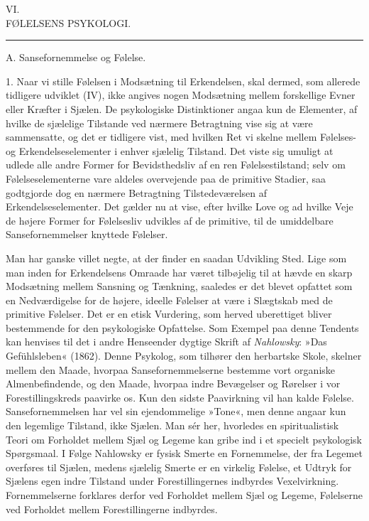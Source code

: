\documentclass[12pt,a4paper,openany]{book}
\newcommand{\opage}[1]{\marginnote{\footnotesize\textit{[#1]}}}
\begin{document}
\clearpage
\opage{268}\begin{center}VI.\\[4pt] FØLELSENS PSYKOLOGI.\\[2pt]\rule{1.5cm}{0.4pt}\end{center}

\begin{center}A. Sansefornemmelse og Følelse.\end{center}

1. Naar vi stille Følelsen i Modsætning til Erkendelsen, skal dermed,
som allerede tidligere udviklet (IV), ikke angives nogen Modsætning
mellem forskellige Evner eller Kræfter i Sjælen. De psykologiske
Distinktioner angaa kun de Elementer, af hvilke de sjælelige Tilstande
ved nærmere Betragtning vise sig at være sammensatte, og det er
tidligere vist, med hvilken Ret vi skelne mellem Følelses- og
Erkendelseselementer i enhver sjælelig Tilstand. Det viste sig umuligt
at udlede alle andre Former for Bevidsthedsliv af en ren
Følelsestilstand; selv om Følelseselementerne vare aldeles overvejende
paa de primitive Stadier, saa godtgjorde dog en nærmere Betragtning
Tilstedeværelsen af Erkendelseselementer. Det gælder nu at vise, efter
hvilke Love og ad hvilke Veje de højere Former for Følelsesliv udvikles
af de primitive, til de umiddelbare Sansefornemmelser knyttede Følelser.

Man har ganske villet negte, at der finder en saadan Udvikling Sted.
Lige som man inden for Erkendelsens Omraade har været tilbøjelig til at
hævde en skarp Modsætning mellem Sansning og Tænkning, saaledes er det
blevet opfattet som en Nedværdigelse for de højere, ideelle Følelser at
være i Slægtskab med de primitive Følelser. Det er en etisk Vurdering,
som herved uberettiget bliver bestemmende for den psykologiske
Opfattelse. Som Exempel paa denne Tendents kan henvises til det i andre
Henseender dygtige Skrift af \emph{Nahlowsky}: »Das Gefühlsleben«
(1862). Denne Psykolog,
\opage{269}som tilhører den herbartske Skole, skelner mellem den Maade,
hvorpaa Sansefornemmelserne bestemme vort organiske Almenbefindende, og
den Maade, hvorpaa indre Bevægelser og Rørelser i vor Forestillingskreds
paavirke os. Kun den sidste Paavirkning vil han kalde Følelse.
Sansefornemmelsen har vel sin ejendommelige »Tone«, men denne angaar kun
den legemlige Tilstand, ikke Sjælen. Man sér her, hvorledes en
spiritualistisk Teori om Forholdet mellem Sjæl og Legeme kan gribe ind i
et specielt psykologisk Spørgsmaal. I Følge Nahlowsky er fysisk Smerte
en Fornemmelse, der fra Legemet overføres til Sjælen, medens sjælelig
Smerte er en virkelig Følelse, et Udtryk for Sjælens egen indre Tilstand
under Forestillingernes indbyrdes Vexelvirkning. Fornemmelserne
forklares derfor ved Forholdet mellem Sjæl og Legeme, Følelserne ved
Forholdet mellem Forestillingerne indbyrdes.
\end{document}
